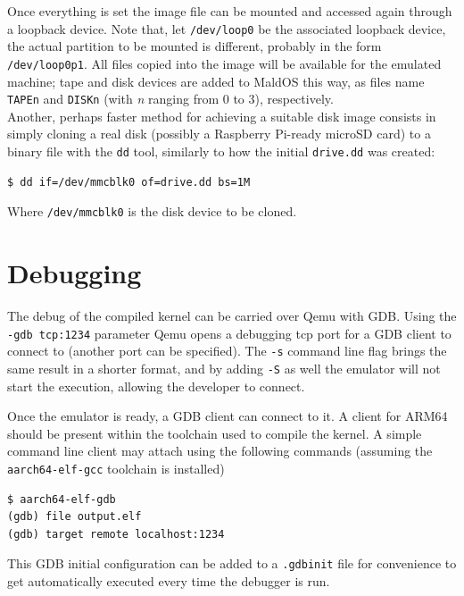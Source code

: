 \documentclass[12pt,a4paper,openright,twoside]{report}
\begin{document}
Once everything is set the image file can be mounted and accessed again
through a loopback device. Note that, let {\tt /dev/loop0} be the associated 
loopback device, the actual partition to be mounted is different, probably in 
the form {\tt /dev/loop0p1}. All files copied into the image will be available 
for the emulated machine; tape and disk devices are added to MaldOS this way,
as files name {\tt TAPEn} and {\tt DISKn} (with \textit{n} ranging from 0 to 3),
respectively.\\

Another, perhaps faster method for achieving a suitable disk image consists in 
simply cloning a real disk (possibly a Raspberry Pi-ready microSD card) to a
binary file with the {\tt dd} tool, similarly to how the initial {\tt drive.dd}
was created:

\begin{lstlisting}[language=sh]
$ dd if=/dev/mmcblk0 of=drive.dd bs=1M
\end{lstlisting}

Where {\tt /dev/mmcblk0} is the disk device to be cloned.

\section{Debugging}
The debug of the compiled kernel can be carried over Qemu with GDB. Using the
{\tt -gdb tcp:1234} parameter Qemu opens a debugging tcp port for a GDB client
to connect to (another port can be specified). The {\tt -s} command line flag 
brings the same result in a shorter format, and by adding {\tt -S} as well the
emulator will not start the execution, allowing the developer to connect.

Once the emulator is ready, a GDB client can connect to it. A client for
ARM64 should be present within the toolchain used to compile the kernel.
 A simple command line client may attach using the following commands (assuming
 the {\tt aarch64-elf-gcc} toolchain is installed)

\begin{lstlisting}[label={lst:gdb}]
$ aarch64-elf-gdb
(gdb) file output.elf
(gdb) target remote localhost:1234
\end{lstlisting}

This GDB initial configuration can be added to a {\tt .gdbinit}
file for convenience to get automatically executed every time the debugger is run.\\
\end{document}

